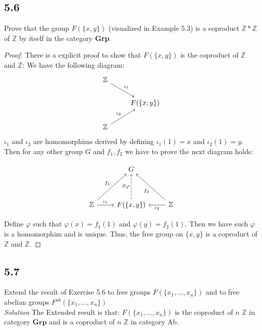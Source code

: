 \documentclass[a4paper, pdf, 12pt]{article}
\begin{document}
\subsection*{5.6}
Prove that the group $F(\{x, y\})$ (visualized in Example 5.3) is a coproduct
$\mathbb{Z} * \mathbb{Z}$ of $\mathbb{Z}$ by itself in the category \textbf{Grp}.

\begin{proof}
  There is a explicit proof to show that $F(\{x, y\})$ is the coproduct of $\mathbb{Z}$ and $\mathbb{Z}$:
  We have the following diagram:
  $$
    \begin{tikzcd}
      \mathbb{Z} \ar[rd, "\iota_{1}"] & \\
      & F(\{x, y\}) \\
      \mathbb{Z} \ar[ru, "\iota_{2}"]
    \end{tikzcd}
  $$
  $\iota_1$ and $\iota_2$ are homomorphims derived by defining $\iota_1(1) = x$ and $\iota_2(1) = y$.
  Then for any other group $G$ and $f_1, f_2$ we have to prove the next diagram holds:
  \begin{center}
    $$
      \begin{tikzcd}[row sep=huge]
        & G &  \\
        \mathbb{Z} \ar[ru, "f_1"] \ar[r, "\iota_{1}"] & F(\{x, y\}) \ar[u, dashed, "\exists!\varphi"]& \ar[lu, "f_2"] \ar[l, "\iota_{2}"] \mathbb{Z}
      \end{tikzcd}
    $$
  \end{center}
  Define $\varphi$ such that $\varphi(x) = f_1(1)$ and $\varphi(y) = f_2(1)$. Then we have such 
  $\varphi$ is a homomorphim and is unique. Thus, the free group on $\{x, y\}$ is a coproduct of $\mathbb{Z}$ and $\mathbb{Z}$.
\end{proof}

\subsection*{5.7}
Extend the result of Exercise 5.6 to free groups $F(\{x_1,\ldots, x_n\})$ and to free
abelian groups $F^{ab}(\{x_1,\ldots, x_n\})$\\

\noindent
\textit{Solution}
  The Extended result is that: $F(\{x_1,\ldots, x_n\})$ is the coproduct of $n$ $\mathbb{Z}$ in category $\mathbf{Grp}$ and is 
  a coproduct of $n$ $\mathbb{Z}$ in category Ab.
\end{document}
